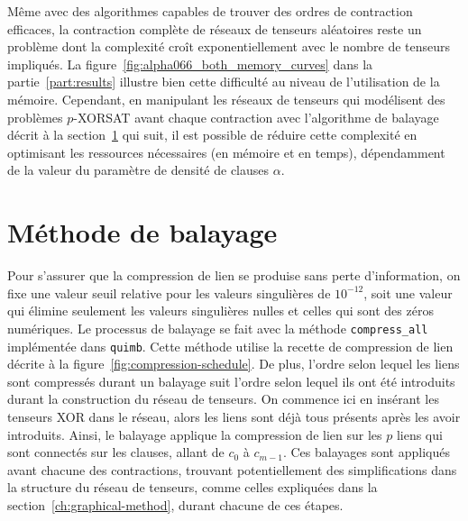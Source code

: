 Même avec des algorithmes capables de trouver des ordres de contraction efficaces, la contraction complète de réseaux de tenseurs aléatoires reste un problème dont la complexité croît exponentiellement avec le nombre de tenseurs impliqués.
La figure~\ref{fig:alpha066_both_memory_curves} dans la partie~\ref{part:results} illustre bien cette difficulté au niveau de l'utilisation de la mémoire.
Cependant, en manipulant les réseaux de tenseurs qui modélisent des problèmes $p$-XORSAT avant chaque contraction avec l'algorithme de balayage décrit à la section~\ref{sec:sweeping-method} qui suit, il est possible de réduire cette complexité en optimisant les ressources nécessaires (en mémoire et en temps), dépendamment de la valeur du paramètre de densité de clauses $\alpha$.


\section{Méthode de balayage} \label{sec:sweeping-method}
Pour s'assurer que la compression de lien se produise sans perte d'information, on fixe une valeur seuil relative pour les valeurs singulières de $10^{-12}$, soit une valeur qui élimine seulement les valeurs singulières nulles et celles qui sont des zéros numériques.
Le processus de balayage se fait avec la méthode \verb|compress_all| implémentée dans \verb|quimb|.
Cette méthode utilise la recette de compression de lien décrite à la figure~\ref{fig:compression-schedule}.
De plus, l'ordre selon lequel les liens sont compressés durant un balayage suit l'ordre selon lequel ils ont été introduits durant la construction du réseau de tenseurs.
On commence ici en insérant les tenseurs XOR dans le réseau, alors les liens sont déjà tous présents après les avoir introduits.
Ainsi, le balayage applique la compression de lien sur les $p$ liens qui sont connectés sur les clauses, allant de $c_0$ à $c_{m-1}$.
Ces balayages sont appliqués avant chacune des contractions, trouvant potentiellement des simplifications dans la structure du réseau de tenseurs, comme celles expliquées dans la section~\ref{ch:graphical-method}, durant chacune de ces étapes.

